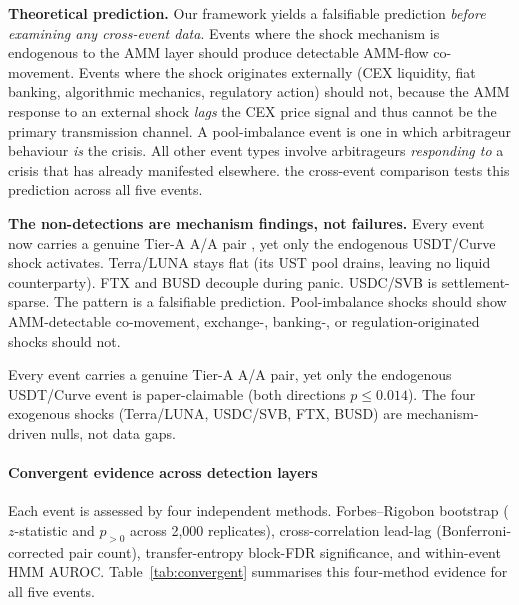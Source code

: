 \documentclass[sigconf,anonymous]{acmart}
\begin{document}
\textbf{Theoretical prediction.}
Our framework yields a falsifiable prediction \emph{before examining any
cross-event data}. Events where the shock mechanism is endogenous to the AMM
layer should produce detectable AMM-flow co-movement. Events where the shock
originates externally (CEX liquidity, fiat banking, algorithmic mechanics,
regulatory action) should not, because the AMM response to an external shock
\emph{lags} the CEX price signal and thus cannot be the primary transmission
channel.  A pool-imbalance event is one in which arbitrageur behaviour \emph{is}
the crisis. All other event types involve arbitrageurs \emph{responding to} a
crisis that has already manifested elsewhere. the cross-event comparison tests this prediction across all five events.



\textbf{The non-detections are mechanism findings, not failures.}  Every event now carries a genuine Tier-A A/A pair , yet only the endogenous USDT/Curve shock activates.  Terra/LUNA stays flat (its UST pool drains, leaving no liquid counterparty). FTX and BUSD decouple during panic. USDC/SVB is settlement-sparse.  The pattern is a falsifiable prediction. Pool-imbalance shocks should show AMM-detectable co-movement, exchange-, banking-, or regulation-originated shocks should not.

Every event carries a genuine Tier-A A/A pair, yet only the endogenous USDT/Curve event is paper-claimable (both directions $p\le0.014$). The four exogenous shocks (Terra/LUNA, USDC/SVB, FTX, BUSD) are mechanism-driven nulls, not data gaps.


\paragraph{Convergent evidence across detection layers}
Each event is assessed by four independent methods. Forbes--Rigobon bootstrap ($z$-statistic and $p_{>0}$ across 2,000 replicates), cross-correlation lead-lag (Bonferroni-corrected pair count), transfer-entropy block-FDR significance, and within-event HMM AUROC.
Table~\ref{tab:convergent} summarises this four-method evidence for all five events.
\end{document}
